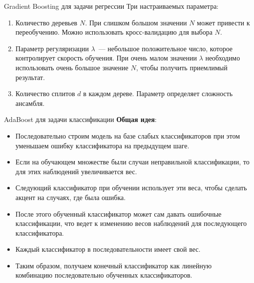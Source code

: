 \documentclass[notheorems, handout]{beamer}
\begin{document}
\begin{frame}{Gradient Boosting для задачи регрессии}
  Три настраиваемых параметра:
  \begin{enumerate}
    \item Количество деревьев $N$. При слишком большом значении $N$
      может привести к переобучению. Можно использовать
      кросс-валидацию для выбора $N$.
    \item Параметр регуляризации $\lambda$~--- небольшое
      положительное число, которое контролирует скорость обучения.
      При очень малом значении $\lambda$ необходимо использовать
      очень большое значение $N$, чтобы получить приемлимый результат.
    \item Количество сплитов $d$ в каждом дереве. Параметр определяет
      сложность ансамбля.
  \end{enumerate}
\end{frame}

\begin{frame}{AdaBoost для задачи классификации}
  \textbf{Общая идея}:
  \begin{itemize}
    \item Последовательно строим модель на базе слабых
      классификаторов при этом уменьшаем ошибку классификатора на
      предыдущем шаге.
    \item Если на обучающем множестве были случаи неправильной
      классификации, то для этих наблюдений увеличивается вес.
    \item Следующий классификатор при обучении использует эти веса,
      чтобы сделать акцент на случаях, где была ошибка.
    \item После этого обученный классификатор может сам давать
      ошибочные классификации, что ведет к изменению весов наблюдений
      для последующего классификатора.
    \item Каждый классификатор в последовательности имеет свой вес.
    \item Таким образом, получаем конечный классификатор как линейную
      комбинацию последовательно обученных классификаторов.
  \end{itemize}
\end{frame}
\end{document}
